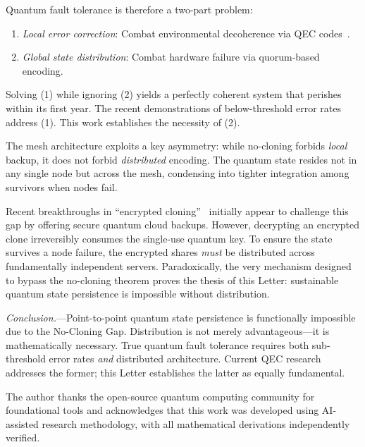 \documentclass[aps,prl,twocolumn,superscriptaddress,showpacs]{revtex4-2}
\begin{document}
Quantum fault tolerance is therefore a two-part problem:
\begin{enumerate}
\item \textit{Local error correction}: Combat environmental decoherence via QEC codes~\cite{shor1995,steane1996,fowler2012}.
\item \textit{Global state distribution}: Combat hardware failure via quorum-based encoding.
\end{enumerate}

Solving (1) while ignoring (2) yields a perfectly coherent system that perishes within its first year. The recent demonstrations of below-threshold error rates~\cite{googleai2023,bluvstein2024} address (1). This work establishes the necessity of (2).

The mesh architecture exploits a key asymmetry: while no-cloning forbids \textit{local} backup, it does not forbid \textit{distributed} encoding. The quantum state resides not in any single node but across the mesh, condensing into tighter integration among survivors when nodes fail.

Recent breakthroughs in ``encrypted cloning''~\cite{kempf2026} initially appear to challenge this gap by offering secure quantum cloud backups. However, decrypting an encrypted clone irreversibly consumes the single-use quantum key. To ensure the state survives a node failure, the encrypted shares \textit{must} be distributed across fundamentally independent servers. Paradoxically, the very mechanism designed to bypass the no-cloning theorem proves the thesis of this Letter: sustainable quantum state persistence is impossible without distribution.

\textit{Conclusion.}—Point-to-point quantum state persistence is functionally impossible due to the No-Cloning Gap. Distribution is not merely advantageous—it is mathematically necessary. True quantum fault tolerance requires both sub-threshold error rates \textit{and} distributed architecture. Current QEC research addresses the former; this Letter establishes the latter as equally fundamental.


\begin{acknowledgments}
The author thanks the open-source quantum computing community for foundational tools and acknowledges that this work was developed using AI-assisted research methodology, with all mathematical derivations independently verified.
\end{acknowledgments}
\end{document}
